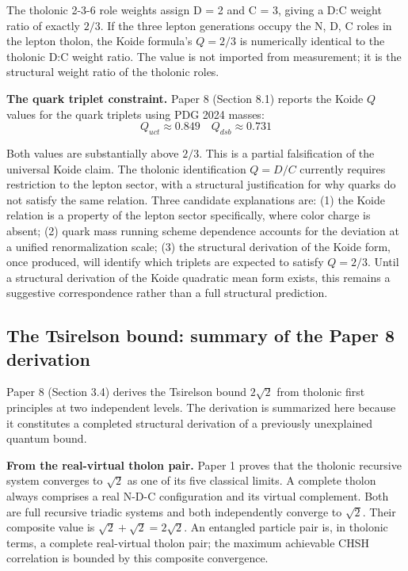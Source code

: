 \documentclass[12pt]{article}
\begin{document}
The tholonic 2-3-6 role weights assign D = 2 and C = 3, giving a D:C
weight ratio of exactly \(2/3\). If the three lepton generations occupy
the N, D, C roles in the lepton tholon, the Koide formula's \(Q = 2/3\)
is numerically identical to the tholonic D:C weight ratio. The value is
not imported from measurement; it is the structural weight ratio of the
tholonic roles.

\textbf{The quark triplet constraint.} Paper 8 (Section 8.1) reports the
Koide \(Q\) values for the quark triplets using PDG 2024 masses:
\[Q_{uct} \approx 0.849 \quad Q_{dsb} \approx 0.731\]

Both values are substantially above \(2/3\). This is a partial
falsification of the universal Koide claim. The tholonic identification
\(Q = D/C\) currently requires restriction to the lepton sector, with a
structural justification for why quarks do not satisfy the same
relation. Three candidate explanations are: (1) the Koide relation is a
property of the lepton sector specifically, where color charge is
absent; (2) quark mass running scheme dependence accounts for the
deviation at a unified renormalization scale; (3) the structural
derivation of the Koide form, once produced, will identify which
triplets are expected to satisfy \(Q = 2/3\). Until a structural
derivation of the Koide quadratic mean form exists, this remains a
suggestive correspondence rather than a full structural prediction.

\subsection{The Tsirelson bound: summary of the Paper 8 derivation}\label{the-tsirelson-bound-summary-of-the-paper-8-derivation}

Paper 8 (Section 3.4) derives the Tsirelson bound \(2\sqrt{2}\) from
tholonic first principles at two independent levels. The derivation is
summarized here because it constitutes a completed structural derivation
of a previously unexplained quantum bound.

\textbf{From the real-virtual tholon pair.} Paper 1 proves that the
tholonic recursive system converges to \(\sqrt{2}\) as one of its five
classical limits. A complete tholon always comprises a real N-D-C
configuration and its virtual complement. Both are full recursive
triadic systems and both independently converge to \(\sqrt{2}\). Their
composite value is \(\sqrt{2} + \sqrt{2} = 2\sqrt{2}\). An entangled
particle pair is, in tholonic terms, a complete real-virtual tholon
pair; the maximum achievable CHSH correlation is bounded by this
composite convergence.
\end{document}
